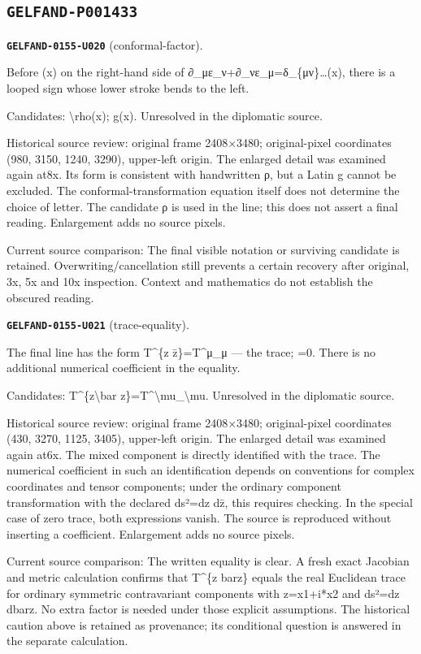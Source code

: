 \subsection*{\texttt{GELFAND-P001433}}
\par\noindent\leavevmode{}\label{GELFAND-0155-U020}\label{GELFAND-P001433:conformal-factor}\textbf{\texttt{GELFAND-0155-U020}} (conformal-factor).\nopagebreak[4]\par
Before (x) on the right-hand side of ∂\_με\_ν+∂\_νε\_μ=δ\_\{μν\}…(x), there is a looped sign whose lower stroke bends to the left.\par
Candidates: \textbackslash{}rho(x); g(x). Unresolved in the diplomatic source.\par
Historical source review: original frame 2408×3480; original-pixel coordinates (980, 3150, 1240, 3290), upper-left origin. The enlarged detail was examined again at8x. Its form is consistent with handwritten ρ, but a Latin g cannot be excluded. The conformal-transformation equation itself does not determine the choice of letter. The candidate ρ is used in the line; this does not assert a final reading. Enlargement adds no source pixels.\par
Current source comparison: The final visible notation or surviving candidate is retained. Overwriting/cancellation still prevents a certain recovery after original, 3x, 5x and 10x inspection. Context and mathematics do not establish the obscured reading.\par
\medskip
\par\noindent\leavevmode{}\label{GELFAND-0155-U021}\label{GELFAND-P001433:trace-equality}\textbf{\texttt{GELFAND-0155-U021}} (trace-equality).\nopagebreak[4]\par
The final line has the form T\textasciicircum{}\{z z̄\}=T\textasciicircum{}μ\_μ — the trace; =0. There is no additional numerical coefficient in the equality.\par
Candidates: T\textasciicircum{}\{z\textbackslash{}bar z\}=T\textasciicircum{}\textbackslash{}mu\_\textbackslash{}mu. Unresolved in the diplomatic source.\par
Historical source review: original frame 2408×3480; original-pixel coordinates (430, 3270, 1125, 3405), upper-left origin. The enlarged detail was examined again at6x. The mixed component is directly identified with the trace. The numerical coefficient in such an identification depends on conventions for complex coordinates and tensor components; under the ordinary component transformation with the declared ds²=dz dz̄, this requires checking. In the special case of zero trace, both expressions vanish. The source is reproduced without inserting a coefficient. Enlargement adds no source pixels.\par
Current source comparison: The written equality is clear. A fresh exact Jacobian and metric calculation confirms that T\textasciicircum{}\{z barz\} equals the real Euclidean trace for ordinary symmetric contravariant components with z=x1+i*x2 and ds²=dz dbarz. No extra factor is needed under those explicit assumptions. The historical caution above is retained as provenance; its conditional question is answered in the separate calculation.\par
\medskip
